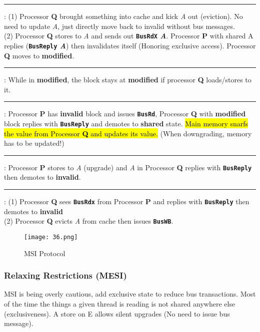\documentclass{article}
\newcommand{\ctext}[3][RGB]{%
  \begingroup
  \definecolor{hlcolor}{#1}{#2}\sethlcolor{hlcolor}%
  \hl{#3}%
  \endgroup
}
\begin{document}
\begin{multicols*}{2}
\smallskip\hrule\smallskip\noindent
[S$\rightarrow$I]: (1) Processor \textbf{Q} brought something into cache and kick \textit{A} out (eviction). No need to update \textit{A}, just directly move back to invalid without bus messages.\\
(2) Processor \textbf{Q} stores to \textit{A} and sends out \textbf{\texttt{BusRdX} \textit{A}}. Processor \textbf{P} with shared A replies (\textbf{\texttt{BusReply} \textit{A}}) then invalidates itself (Honoring exclusive access). Processor \textbf{Q} moves to \textbf{modified}.

\smallskip\hrule\smallskip\noindent
[M$\rightarrow$M]: While in \textbf{modified}, the block stays at \textbf{modified} if processor \textbf{Q} loads/stores to it.

\smallskip\hrule\smallskip\noindent
[M$\rightarrow$S]: Processor \textbf{P} has \textbf{invalid} block and issues \textbf{\texttt{BusRd}}, Processor \textbf{Q} with \textbf{modified} block replies with \textbf{\texttt{BusReply}} and demotes to \textbf{shared} state. \ctext[RGB]{232,209,82}{Main memory snarfs the value from Processor \textbf{Q} and updates its value.} (When downgrading, memory has to be updated!)

\smallskip\hrule\smallskip\noindent
[S/I$\rightarrow$M]: Processor \textbf{P} stores to \textit{A} (upgrade) and \textit{A} in Processor \textbf{Q} replies with \textbf{\texttt{BusReply}} then demotes to \textbf{invalid}.

\smallskip\hrule\smallskip\noindent
[M$\rightarrow$I]: (1) Processor \textbf{Q} sees \textbf{\texttt{BusRdx}} from Processor \textbf{P} and replies with \textbf{\texttt{BusReply}} then demotes to \textbf{invalid}\\
(2) Processor \textbf{Q} evicts \textit{A} from cache then issues \textbf{\texttt{BusWB}}.

\begin{figure}[H]
    \centering
    {\texttt{[image: 36.png]}}
  \caption{MSI Protocol}
\end{figure}

\subsubsection*{Relaxing Restrictions (MESI)}
MSI is being overly cautious, add exclusive state to reduce bus transactions. Most of the time the things a given thread is reading is not shared anywhere else (exclusiveness). A store on E allows silent upgrades (No need to issue bus message).


\end{multicols*}
\end{document}
